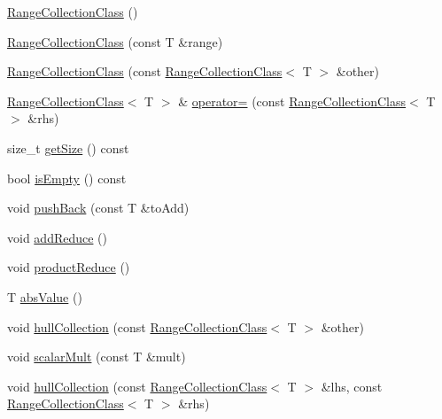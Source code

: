 \begin{DoxyCompactItemize}
\item 
\hyperlink{classsubpavings_1_1RangeCollectionClass_aef62d2aa5ff8ba9dec79cb9bb714fc68}{\-Range\-Collection\-Class} ()
\item 
\hyperlink{classsubpavings_1_1RangeCollectionClass_a994407fb9063dec6364b57697ee4ffbd}{\-Range\-Collection\-Class} (const \-T \&range)
\item 
\hyperlink{classsubpavings_1_1RangeCollectionClass_afd2ea195d16d474bf618c2fd478cdfc4}{\-Range\-Collection\-Class} (const \hyperlink{classsubpavings_1_1RangeCollectionClass}{\-Range\-Collection\-Class}$<$ \-T $>$ \&other)
\item 
\hyperlink{classsubpavings_1_1RangeCollectionClass}{\-Range\-Collection\-Class}$<$ \-T $>$ \& \hyperlink{classsubpavings_1_1RangeCollectionClass_aba4094c69cec254d23643c00051ce068}{operator=} (const \hyperlink{classsubpavings_1_1RangeCollectionClass}{\-Range\-Collection\-Class}$<$ \-T $>$ \&rhs)
\item 
size\-\_\-t \hyperlink{classsubpavings_1_1RangeCollectionClass_ac7965fd94f11b817f6f533a5dab2a106}{get\-Size} () const 
\item 
bool \hyperlink{classsubpavings_1_1RangeCollectionClass_a777b04fa8e011fdbaabdd85ced542e83}{is\-Empty} () const 
\item 
void \hyperlink{classsubpavings_1_1RangeCollectionClass_aad3fca9cdacde8581cd6d1684357d1d1}{push\-Back} (const \-T \&to\-Add)
\item 
void \hyperlink{classsubpavings_1_1RangeCollectionClass_ab0bda06429ce2355970cdfe02a1c1b36}{add\-Reduce} ()
\item 
void \hyperlink{classsubpavings_1_1RangeCollectionClass_acc3641f81593a24b242bed4f223cbd85}{product\-Reduce} ()
\item 
\-T \hyperlink{classsubpavings_1_1RangeCollectionClass_a98e31e9ed0220ed3358860b808258a55}{abs\-Value} ()
\item 
void \hyperlink{classsubpavings_1_1RangeCollectionClass_ad34b794f99d2b254f1a7d8a1fa608bf8}{hull\-Collection} (const \hyperlink{classsubpavings_1_1RangeCollectionClass}{\-Range\-Collection\-Class}$<$ \-T $>$ \&other)
\item 
void \hyperlink{classsubpavings_1_1RangeCollectionClass_acf3cc8c38b9a009312dc4d6660705958}{scalar\-Mult} (const \-T \&mult)
\item 
void \hyperlink{classsubpavings_1_1RangeCollectionClass_ab2bb4230d2cdfffab259895a8bf0037d}{hull\-Collection} (const \hyperlink{classsubpavings_1_1RangeCollectionClass}{\-Range\-Collection\-Class}$<$ \-T $>$ \&lhs, const \hyperlink{classsubpavings_1_1RangeCollectionClass}{\-Range\-Collection\-Class}$<$ \-T $>$ \&rhs)

\end{DoxyCompactItemize}
